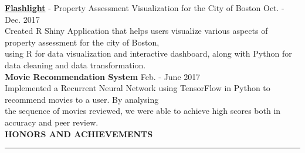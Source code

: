 \documentclass[a4paper]{article}
\newcommand{\myline}{\par
  \kern2pt %
  \hrule height 0.5pt
  \kern2pt %
}
\newcommand{\mybullet}{
	\indent \textbullet \hspace*{2mm}
}
\begin{document}
			\noindent
      \textbf{\href{https://github.com/sichenghao1992/DS5110Project}{Flashlight}} - Property 
			Assessment Visualization for the City of Boston \hfill Oct. - Dec. 2017 \\
			\mybullet Created R Shiny Application that helps users visualize various aspects of 
			property assessment for the city of  Boston, \\ \hspace*{9mm} using 
			R for data visualization and interactive dashboard, along with Python for data cleaning 
			and data transformation. \\
			
			\noindent
			\textbf{Movie Recommendation System} \hfill Feb. - June 2017\\
			\mybullet Implemented a Recurrent Neural Network using TensorFlow in Python to recommend 
      movies to a user. By analysing \\ \hspace*{9mm} the sequence of movies reviewed, we were 
      able to achieve high scores both in accuracy and peer review. \\ 

	
		
	
	\noindent
	{\large \textbf{HONORS AND ACHIEVEMENTS}}
	\myline 
	\smallskip
\end{document}
